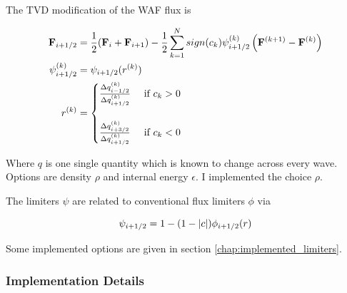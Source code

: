 The TVD modification of the WAF flux is


\begin{align}
	\F_{i + \half} 
		&= \frac{1}{2} (\F_i + \F_{i+1}) - \frac{1}{2} \sum\limits_{k = 1}^{N} sign(c_k) \psi_{i+\half}^{(k)} \left (\F^{(k+1)} - \F^{(k)} \right) \\
	\psi_{i+\half}^{(k)}
		&= \psi_{i+\half}(r^{(k)}) \\
	r^{(k)} &=
		\begin{cases}
			\frac{\Delta q_{i-\half}^{(k)}}{\Delta q_{i+\half}^{(k)}}	& \text{ if } c_k > 0 \\[2em]
			\frac{\Delta q_{i+3/2}^{(k)}}{\Delta q_{i+\half}^{(k)}}	& \text{ if } c_k < 0 \\		
		\end{cases}
\end{align}

Where $q$ is one single quantity which is known to change across every wave.
Options are density $\rho$ and internal energy $\epsilon$.
I implemented the choice $\rho$.

The limiters $\psi$ are related to conventional flux limiters $\phi$ via

\begin{equation}
	\psi_{i+1/2} = 1 - ( 1 - |c|) \phi_{i+1/2}(r)
\end{equation}

Some implemented options are given in section \ref{chap:implemented_limiters}.















\subsubsection{Implementation Details}\label{chap:hydro-WAF-details}


